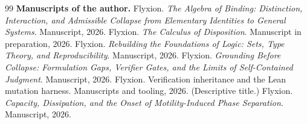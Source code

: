 \begin{thebibliography}{99}
\medskip\noindent\textbf{Manuscripts of the author.}
 Flyxion. \emph{The Algebra of Binding: Distinction, Interaction, and Admissible Collapse from Elementary Identities to General Systems}. Manuscript, 2026.
 Flyxion. \emph{The Calculus of Disposition}. Manuscript in preparation, 2026.
 Flyxion. \emph{Rebuilding the Foundations of Logic: Sets, Type Theory, and Reproducibility}. Manuscript, 2026.
 Flyxion. \emph{Grounding Before Collapse: Formulation Gaps, Verifier Gates, and the Limits of Self-Contained Judgment}. Manuscript, 2026.
 Flyxion. Verification inheritance and the Lean mutation harness. Manuscripts and tooling, 2026. (Descriptive title.)
 Flyxion. \emph{Capacity, Dissipation, and the Onset of Motility-Induced Phase Separation}. Manuscript, 2026.
\end{thebibliography}
